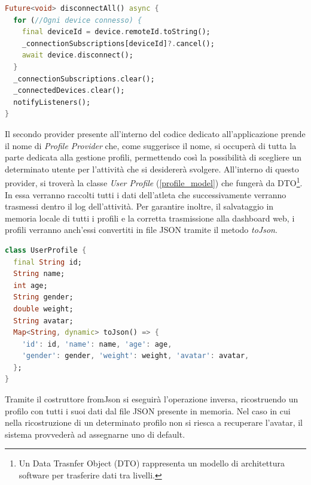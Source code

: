 \documentclass[target=bach,aauheader=,style=]{thud}
\begin{document}
\begin{lstlisting}[language=dart, caption={Procedura per la disconnessione di tutti i sensori.}, label={provider_disconnect_all}]
Future<void> disconnectAll() async {
  for (//Ogni device connesso) {
    final deviceId = device.remoteId.toString();
    _connectionSubscriptions[deviceId]?.cancel();
    await device.disconnect();
  }
  _connectionSubscriptions.clear();
  _connectedDevices.clear();
  notifyListeners();
}
\end{lstlisting}
Il secondo provider presente all'interno del codice dedicato all'applicazione prende il nome di \textit{Profile Provider} che, come suggerisce il nome, si occuperà di tutta la parte dedicata alla gestione profili, permettendo così la possibilità di scegliere un determinato utente per l'attività che si desidererà svolgere. All'interno di questo provider, si troverà la classe \textit{User Profile} (\ref{profile_model}) che fungerà da DTO\footnote{Un Data Trasnfer Object (DTO) rappresenta un modello di architettura software per trasferire dati tra livelli.}. In essa verranno raccolti tutti i dati dell'atleta che successivamente verranno trasmessi dentro il log dell'attività. Per garantire inoltre, il salvataggio in memoria locale di tutti i profili e la corretta trasmissione alla dashboard web, i profili verranno anch'essi convertiti in file JSON tramite il metodo \textit{toJson}.

\begin{lstlisting}[language=dart, caption={Definizione del modello dati UserProfile e serializzazione JSON.}, label={profile_model}]
class UserProfile {
  final String id;
  String name;
  int age;
  String gender; 
  double weight;
  String avatar; 
  Map<String, dynamic> toJson() => {
    'id': id, 'name': name, 'age': age,
    'gender': gender, 'weight': weight, 'avatar': avatar,
  };
}
\end{lstlisting}
Tramite il costruttore fromJson si eseguirà l'operazione inversa, ricostruendo un profilo con tutti i suoi dati dal file JSON presente in memoria. Nel caso in cui nella ricostruzione di un determinato profilo non si riesca a recuperare l'avatar, il sistema provvederà ad assegnarne uno di default. 
\end{document}
